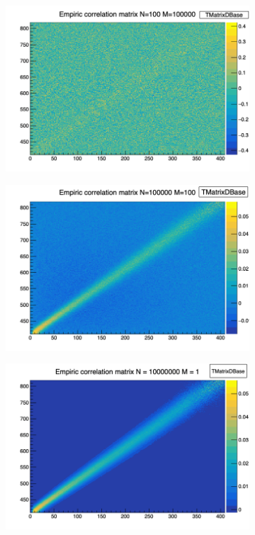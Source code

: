 \documentclass[../main.tex]{subfiles}
\begin{document}
\begin{figure}[ht]
  \begin{subfigure}[t]{0.33\linewidth}
    \includegraphics[width=\linewidth]{images/joint_fit/estimated_corr_N_100_M_100000.png}
    \caption{}
    \label{fig:joint_fit:empirical_cor:small}
  \end{subfigure}
  \begin{subfigure}[t]{0.33\linewidth}
    \includegraphics[width=\linewidth]{images/joint_fit/estimated_corr_N_100000_M_100.png}
    \caption{}
    \label{fig:joint_fit:empirical_cor:medium}
  \end{subfigure}
  \begin{subfigure}[t]{0.33\linewidth}
    \includegraphics[width=\linewidth]{images/joint_fit/estimated_corr_N_10000000_M_1.png}

\end{subfigure}
\end{figure}
\end{document}

